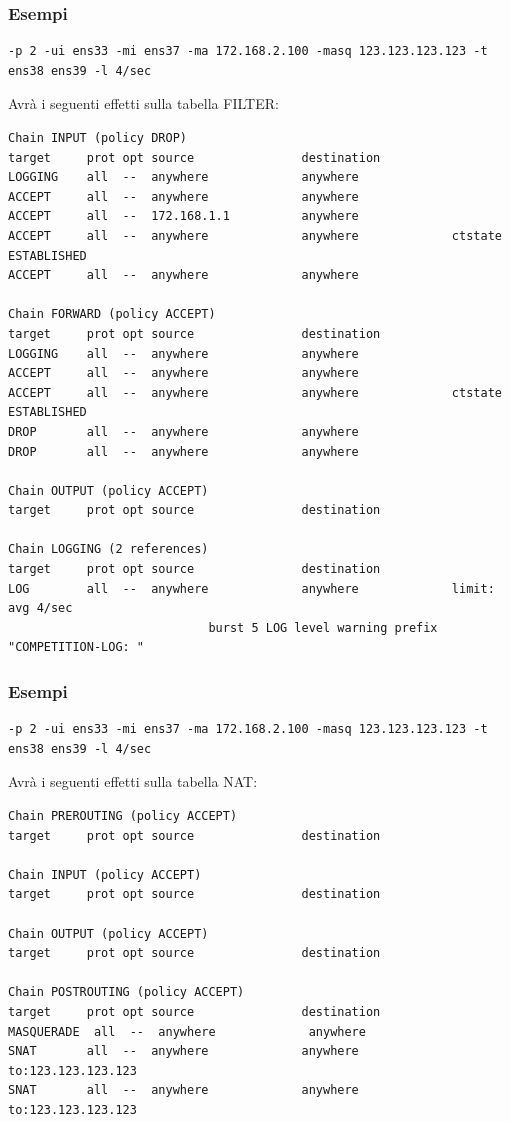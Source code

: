 \documentclass{beamer}
\begin{document}
\begin{frame}[fragile]
    \frametitle{Esempi}
    \begin{lstlisting}
-p 2 -ui ens33 -mi ens37 -ma 172.168.2.100 -masq 123.123.123.123 -t ens38 ens39 -l 4/sec
    \end{lstlisting}
    Avrà i seguenti effetti sulla tabella FILTER:
    \begin{lstlisting}
Chain INPUT (policy DROP)
target     prot opt source               destination         
LOGGING    all  --  anywhere             anywhere            
ACCEPT     all  --  anywhere             anywhere            
ACCEPT     all  --  172.168.1.1          anywhere            
ACCEPT     all  --  anywhere             anywhere             ctstate ESTABLISHED
ACCEPT     all  --  anywhere             anywhere            

Chain FORWARD (policy ACCEPT)
target     prot opt source               destination         
LOGGING    all  --  anywhere             anywhere            
ACCEPT     all  --  anywhere             anywhere            
ACCEPT     all  --  anywhere             anywhere             ctstate ESTABLISHED
DROP       all  --  anywhere             anywhere            
DROP       all  --  anywhere             anywhere            

Chain OUTPUT (policy ACCEPT)
target     prot opt source               destination         

Chain LOGGING (2 references)
target     prot opt source               destination         
LOG        all  --  anywhere             anywhere             limit: avg 4/sec 
                            burst 5 LOG level warning prefix "COMPETITION-LOG: "
    \end{lstlisting}
\end{frame}

\begin{frame}[fragile]
    \frametitle{Esempi}
    \begin{lstlisting}
-p 2 -ui ens33 -mi ens37 -ma 172.168.2.100 -masq 123.123.123.123 -t ens38 ens39 -l 4/sec

    \end{lstlisting}
    Avrà i seguenti effetti sulla tabella NAT:
    \begin{lstlisting}
Chain PREROUTING (policy ACCEPT)
target     prot opt source               destination         

Chain INPUT (policy ACCEPT)
target     prot opt source               destination         

Chain OUTPUT (policy ACCEPT)
target     prot opt source               destination         

Chain POSTROUTING (policy ACCEPT)
target     prot opt source               destination         
MASQUERADE  all  --  anywhere             anywhere            
SNAT       all  --  anywhere             anywhere             to:123.123.123.123
SNAT       all  --  anywhere             anywhere             to:123.123.123.123
    \end{lstlisting}
\end{frame}
\end{document}

